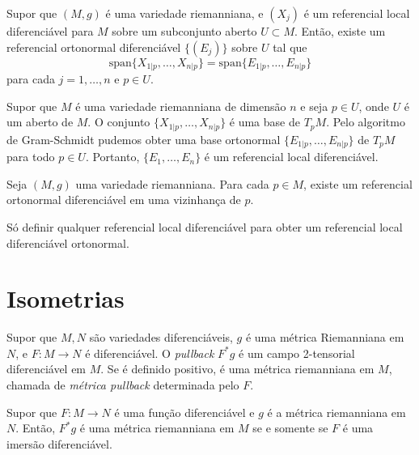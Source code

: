 \begin{proposicao}
	Supor que $(M,g)$ é uma variedade riemanniana, e $(X_j)$ é um referencial local diferenciável para $M$ sobre um subconjunto aberto $U \subset M$. Então, existe um referencial ortonormal diferenciável $\{ (E_j)\}$ sobre $U$ tal que
	\begin{equation*}
		\text{span} \{ X_{1|p}, \ldots, X_{n|p} \} = \text{span} \{ E_{1|p}, \ldots, E_{n|p} \}
	\end{equation*}
	para cada $ j=1, \ldots, n $ e $p \in U$.
\end{proposicao}

\begin{demonstracao}
	Supor que $M$ é uma variedade riemanniana de dimensão $n$ e seja $p \in U$, onde $U$ é um aberto de $M$. O conjunto $\{ X_{1|p},\ldots,X_{n|p} \}$ é uma base de $T_pM$. Pelo algoritmo de Gram-Schmidt pudemos obter uma base ortonormal $\{ E_{1|p},\ldots,E_{n|p} \}$ de $T_pM$ para todo $p \in U$. Portanto, $\{ E_1,\ldots,E_n \}$ é um referencial local diferenciável.
\end{demonstracao}

\begin{corolario}
	Seja $(M,g)$ uma variedade riemanniana. Para cada $p \in M$, existe um referencial ortonormal diferenciável em uma vizinhança de $p$.
\end{corolario}

\begin{demonstracao}
	Só definir qualquer referencial local diferenciável para obter um referencial local diferenciável ortonormal.
\end{demonstracao}

\section{Isometrias}

\begin{definicao}\label{metrica_pullback}
	Supor que $M,N$ são variedades diferenciáveis, $g$ é uma métrica Riemanniana em $N$, e $F: M \rightarrow N$ é diferenciável. O \emph{pullback} $F^* g$ é um campo 2-tensorial diferenciável em $M$. Se é definido positivo, é uma métrica riemanniana em $M$, chamada de \emph{métrica pullback} determinada pelo $F$.
\end{definicao}

\begin{proposicao}
	Supor que $F: M \rightarrow N$ é uma função diferenciável e $g$ é a métrica riemanniana em $N$. Então, $F^* g$ é uma métrica riemanniana em $M$ se e somente se $F$ é uma imersão diferenciável.
\end{proposicao}

